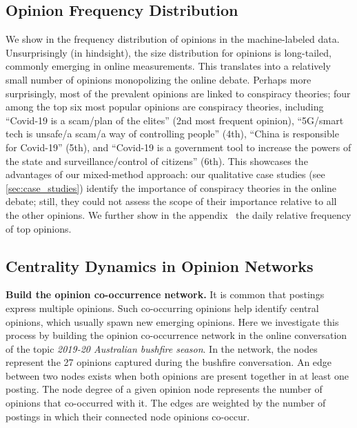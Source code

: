 \subsection{Opinion Frequency Distribution} %
\label{subsec:frequency-analysis}
We show in  the frequency distribution of opinions in the machine-labeled data.
Unsurprisingly (in hindsight), the size distribution for opinions is long-tailed, commonly emerging in online measurements.
This translates into a relatively small number of opinions monopolizing the online debate.
Perhaps more surprisingly, most of the prevalent opinions are linked to conspiracy theories; 
four among the top six most popular opinions are conspiracy theories, including 
``Covid-19 is a scam/plan of the elites'' (2nd most frequent opinion),
``5G/smart tech is unsafe/a scam/a way of controlling people'' (4th),
``China is responsible for Covid-19'' (5th), and 
``Covid-19 is a government tool to increase the powers of the state and surveillance/control of citizens'' (6th). 
This showcases the advantages of our mixed-method approach: our qualitative case studies (see \cref{sec:case_studies}) identify the importance of conspiracy theories in the online debate; still, they could not assess the scope of their importance relative to all the other opinions.
We further show in the appendix~\citep{appendix} the daily relative frequency of top opinions.

\subsection{Centrality Dynamics in Opinion Networks}



\textbf{Build the opinion co-occurrence network.}
It is common that postings express multiple opinions. 
Such co-occurring opinions help identify central opinions, which usually spawn new emerging opinions. 
Here we investigate this process by building the opinion co-occurrence network in the online conversation of the topic \textit{2019-20 Australian bushfire season}.
In the network, the nodes represent the 27 opinions captured during the bushfire conversation.
An edge between two nodes exists when both opinions are present together in at least one posting. 
The node degree of a given opinion node represents the number of opinions that co-occurred with it. 
The edges are weighted by the number of postings in which their connected node opinions co-occur.

